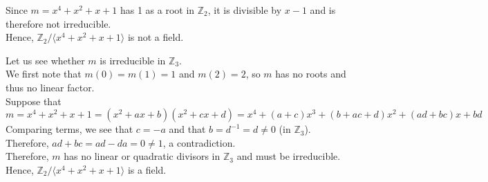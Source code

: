 \documentclass[11pt]{article}
\begin{document}
\bigskip{}
Since $m = x^4+x^2+x+1$ has 1 as a root in $\mathbb{Z}_2$,
it is divisible by $x-1$ and is therefore not irreducible.\\
Hence, $\mathbb{Z}_2/\langle x^4+x^2+x+1\rangle$ is not a field.

\medskip
Let us see whether $m$ is irreducible in $\mathbb{Z}_3$.\\
We first note that $m(0) = m(1) = 1$ and $m(2) = 2$, so $m$ has no roots and thus no linear factor.\\
Suppose that
\[
  m =  x^4 + x^2+ x + 1
    = (x^2 + ax + b)(x^2 + cx + d)
    =  x^4 + (a+c)x^3 + (b+ac+d)x^2 + (ad+bc)x + bd
\]
Comparing terms, we see that $c = -a$ and that $b = d^{-1} = d\neq 0$ (in $\mathbb{Z}_3$).\\
Therefore, $ad+bc = ad-da = 0\neq 1$, a contradiction.\\
Therefore, $m$ has no linear or quadratic divisors in $\mathbb{Z}_3$ and must be irreducible.\\
Hence, $\mathbb{Z}_2/\langle x^4+x^2+x+1\rangle$ is a field.
\end{document}
